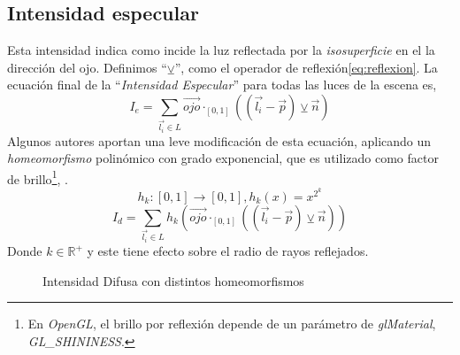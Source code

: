 \subsection{Intensidad especular}
Esta intensidad indica como incide la luz reflectada  por la \textit{isosuperficie} en el la dirección del ojo. Definimos \enquote{\(\veebar\)}, como el operador de reflexión\ref{eq:reflexion}. La ecuación final de la \enquote{\textit{Intensidad Especular}} para todas las luces de la escena es,
\[I_e = \sum_{\Vec{l_i}\in L} \Vec{ojo}\cdot_{[0, 1]}\left(\left(\Vec{l_i}-\Vec{p}\right) \veebar \Vec{n}\right)\]
Algunos autores aportan una leve modificación de esta ecuación, aplicando un \textit{homeomorfismo} polinómico con grado exponencial, que es utilizado como factor de brillo\footnote{En \textit{OpenGL}, el brillo por reflexión depende de un parámetro de  \textit{glMaterial}, \textit{GL\_SHININESS}.}, \cite{glmaterial}.
\[h_k:[0,1]\longrightarrow[0,1] , h_k(x)=x^{2^k}\]
\[I_d = \sum_{\Vec{l_i}\in L} h_k\left(\Vec{ojo}\cdot_{[0, 1]}\left(\left(\Vec{l_i}-\Vec{p}\right) \veebar \Vec{n}\right)\right)\]
Donde \(k\in\mathbb{R}^{+}\) y este tiene efecto sobre el radio de rayos reflejados.
\begin{figure}[H]
  \centering
  \captionsetup{justification=centering}%
  \hfill
  \hfill
  \caption{Intensidad Difusa con distintos homeomorfismos}
  \label{fig:specular}
\end{figure}

